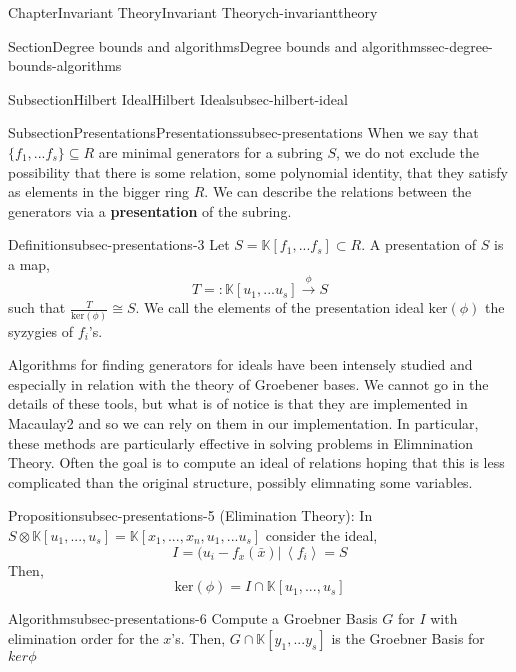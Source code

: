 \documentclass[oneside,10pt,]{book}
\newcommand{\terminology}[1]{\textbf{#1}}
\begin{document}
\begin{chapterptx}{Chapter}{Invariant Theory}{}{Invariant Theory}{}{}{ch-invarianttheory}
\begin{sectionptx}{Section}{Degree bounds and algorithms}{}{Degree bounds and algorithms}{}{}{sec-degree-bounds-algorithms}
\begin{subsectionptx}{Subsection}{Hilbert Ideal}{}{Hilbert Ideal}{}{}{subsec-hilbert-ideal}
\end{subsectionptx}
%
%
\typeout{************************************************}
\typeout{************************************************}
%
\begin{subsectionptx}{Subsection}{Presentations}{}{Presentations}{}{}{subsec-presentations}
When we say that  \(\{f_1,...f_s\} \subseteq R\) are minimal generators for a subring \(S\), we do not exclude the possibility that there is some relation, some polynomial identity, that they satisfy as elements in the bigger ring \(R\). We can describe the relations between the generators via a \terminology{presentation} of the subring.%
\begin{definition}{Definition}{}{subsec-presentations-3}%
Let \(S = \mathbb{K}[f_1,...f_s] \subset R\). A presentation of \(S\) is a map,%
\begin{equation*}
T=: \mathbb{K}[u_1,...u_s] \xrightarrow{\phi}S
\end{equation*}
such that \(\frac{T}{\text{ker}(\phi)} \cong S\). We call the elements of the presentation ideal \(\text{ker}(\phi)\) the syzygies of \(f_i\)'s.%
\end{definition}
Algorithms for finding generators for ideals have been intensely studied and especially in relation with the theory of Groebener bases. We cannot go in the details of these tools, but what is of notice is that they are implemented in Macaulay2 and so we can rely on them in our implementation. In particular, these methods are particularly effective in solving problems in Elimnination Theory.  Often the goal is to compute an ideal of relations hoping that this is less complicated than the original structure, possibly elimnating some variables.%
\begin{proposition}{Proposition}{}{}{subsec-presentations-5}%
(Elimination Theory): In \(S \otimes \mathbb{K}[u_1,...,u_s] = \mathbb{K}[x_1,...,x_n,u_1,...u_s]\) consider the ideal,%
\begin{equation*}
I = (u_i - f_x(\bar x) | \, \left\langle f_i\right\rangle = S
\end{equation*}
Then,%
\begin{equation*}
\text{ker} (\phi)= I \cap \mathbb{K}[u_1,...,u_s]
\end{equation*}
%
\end{proposition}
\begin{algorithm}{Algorithm}{}{}{subsec-presentations-6}%
Compute a Groebner Basis \(G\) for \(I\) with elimination order for the \(x\)'s. Then, \(G \cap \mathbb{K}[y_1,...y_s]\)  is the Groebner Basis for \(ker \phi\)%

\end{algorithm}
\end{subsectionptx}
\end{sectionptx}
\end{chapterptx}
\end{document}
